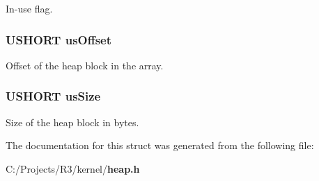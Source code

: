 In-\/use flag. 
\subsubsection[{usOffset}]{\setlength{\rightskip}{0pt plus 5cm}USHORT {\bf usOffset}}\label{struct_h_e_a_p___b_l_o_c_k___s_t_r_u_c_t_a8911ff28f5ea45a85b2fac8fb06b5a8b}


Offset of the heap block in the array. 
\subsubsection[{usSize}]{\setlength{\rightskip}{0pt plus 5cm}USHORT {\bf usSize}}\label{struct_h_e_a_p___b_l_o_c_k___s_t_r_u_c_t_a27bae3014e7dc0b9e6e69c230dc1f85d}


Size of the heap block in bytes. 

The documentation for this struct was generated from the following file:\begin{DoxyCompactItemize}
\item 
C:/Projects/R3/kernel/{\bf heap.h}\end{DoxyCompactItemize}
